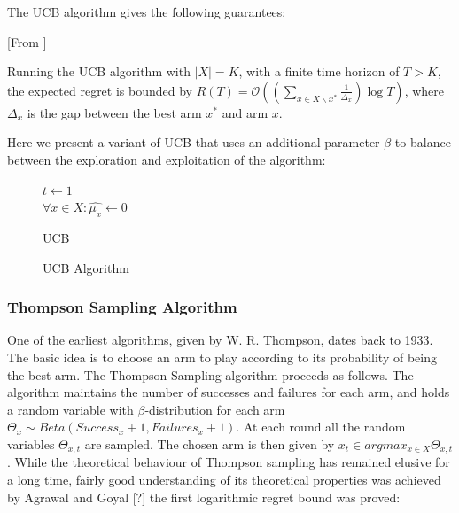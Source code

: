 \documentclass{llncs}
\begin{document}
	The UCB algorithm gives the following guarantees:
	
	
\begin{theorem}\label{thm:UCB}[From \cite{...}]

		Running the UCB algorithm with $|X|=K$, with a finite time horizon of $ T > K$, the expected regret is bounded by $R(T) = \mathcal{O} \left( \left(\sum_{x\in X \backslash x^*} \frac{1}{\Delta_x} \right)\log T \right)$, where $\Delta_x$ is the gap between the best arm $x^*$ and arm $x$.

	\end{theorem}		
	Here we present a variant of UCB that uses an additional parameter $ \beta $ to balance between the exploration and exploitation of the algorithm:
	\begin{figure}[h]
	\IncMargin{1em}
		\begin{algorithm}[H]
		
			$ t\leftarrow 1$\\
			$\forall x \in X : \hat{\mu_x} \leftarrow 0$\\
			\BlankLine
			
			\caption{UCB}
		\end{algorithm}
		\caption{UCB Algorithm}\label{algo_UCB}
	\end{figure}

	\subsubsection{Thompson Sampling Algorithm}	
	One of the earliest algorithms, given by W. R. Thompson, dates back to 1933. The basic idea is to choose an arm to play according to its probability of being the best arm.
	The Thompson Sampling algorithm proceeds as follows.
	The algorithm maintains the number of successes and failures for each arm, and holds a random variable with $\beta$-distribution for each arm $\Theta_x\sim Beta(Success_x+1,Failures_x+1)$.
	At each round all the random variables $\Theta_{x,t}$ are sampled.
	The chosen arm is then given by $ x_t \in argmax_{x\in X} \Theta_{x,t}$. 
	While the theoretical behaviour of Thompson sampling has remained elusive for a long time, fairly good understanding of its theoretical properties was achieved by Agrawal and Goyal [?] the first logarithmic regret bound was proved: 
	
\end{document}
